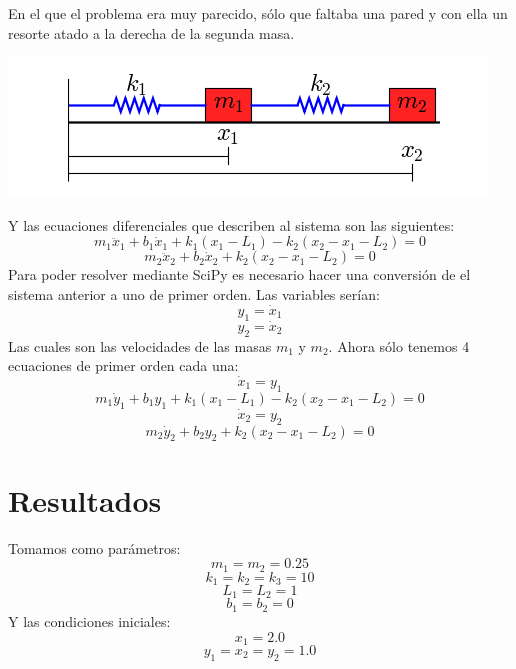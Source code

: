 \documentclass{article}
\begin{document}
En el que el problema era muy parecido, sólo que faltaba una pared y con ella un resorte atado a la derecha de la segunda masa.
\begin{center}
    \includegraphics[scale = 0.65]{two_springs_diagram.png}
\end{center}
Y las ecuaciones diferenciales que describen al sistema son las siguientes:
\begin{equation}
    m_1 \ddot{x}_1 + b_1 \dot x_1+k_1 (x_1 − L_1) − k_2 (x_2 −x_1 − L_2) = 0
\end{equation}
\begin{equation}
    m_2 \ddot{x}_2 + b_2 \dot x_2 + k_2 (x_2 − x_1 − L_2) = 0
\end{equation}
Para poder resolver mediante SciPy es necesario hacer una conversión de el sistema anterior a uno de primer orden. Las variables serían:
\begin{equation}
    y_1 = \dot x_1
\end{equation}
\begin{equation}
    y_2 = \dot x_2        
\end{equation}
Las cuales son las velocidades de las masas $m_1$ y $m_2$. Ahora sólo tenemos 4 ecuaciones de primer orden cada una:
\begin{equation}
    \dot x_1 = y_1
\end{equation}
\begin{equation}
    m_1 \dot y_1 + b_1 y_1 + k_1(x_1 - L_1) - k_2 (x_2 - x_1 - L_2) = 0
\end{equation}
\begin{equation}
    \dot x_2 = y_2
\end{equation}
\begin{equation}
    m_2 \dot y_2 + b_2 y_2 + k_2 (x_2 - x_1 - L_2) = 0
\end{equation}

\section{Resultados}
Tomamos como parámetros:
$$m_1=m_2=0.25$$
$$k_1=k_2=k_3=10$$
$$L_1=L_2=1$$
$$b_1=b_2=0$$
Y las condiciones iniciales:
$$x_1 = 2.0$$
$$y_1 = x_2 = y_2 = 1.0$$
\clearpage
\end{document}
